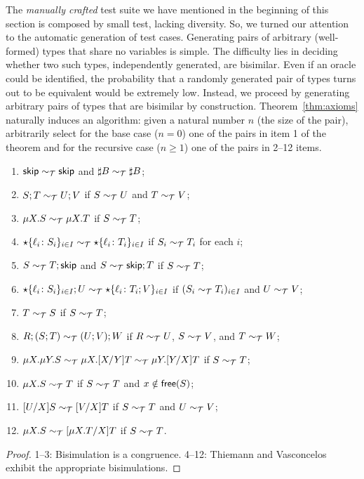 The \emph{manually crafted} test suite we have mentioned in the beginning
of this section is composed by small test, lacking diversity.
So, we turned our attention to the automatic generation of test
cases. Generating pairs of arbitrary (well-formed) types that share no
variables is simple. The difficulty lies in deciding whether two such
types, independently generated, are bisimilar. Even if an oracle could
be identified, the probability that a randomly generated pair of types
turns out to be equivalent would be extremely low. Instead, we proceed
by generating arbitrary pairs of types that are bisimilar by
construction. Theorem~\ref{thm:axioms} naturally induces an algorithm:
given a natural number $n$ (the size of the pair), arbitrarily select
for the base case ($n=0$) one of the pairs in item 1 of the theorem
and for the recursive case ($n\ge1$) one of the pairs in 2--12 items.

\begin{theorem}
\label{thm:axioms}
{\small  \begin{enumerate}[leftmargin=*]
  \item $\mathsf{skip} \sim_\mathcal T \mathsf{skip}$ and $\sharp B \sim_\mathcal T \sharp B$;
  \item $S;T \sim_\mathcal T U;V$ if $S \sim_\mathcal T U$ and $T \sim_\mathcal T V$;
  \item $\mu X.S \sim_\mathcal T \mu X.T$ if $S \sim_\mathcal T T$;
  \item $\star\{\ell_i\colon S_i\}_{i\in I}\sim_\mathcal T
    \star\{\ell_i\colon T_i\}_{i\in I}$ if $S_i \sim_\mathcal T T_i$ for each $i$;
  \item $S\sim_\mathcal T T;\mathsf{skip}$ and $S\sim_\mathcal T \mathsf{skip};T$ if $S \sim_\mathcal T T$;
  \item $\star\{\ell_i\colon S_i\}_{i\in I};U\sim_\mathcal T
    \star\{\ell_i\colon T_i;V\}_{i\in I}$ if $(S_i \sim_\mathcal T T_i)_{i\in
      I}$ and $U \sim_\mathcal T V$;
  \item $T \sim_\mathcal T S$ if $S \sim_\mathcal T T$;
  \item $R;(S;T) \sim_\mathcal T (U;V);W$ if $R \sim_\mathcal T U$, $S \sim_\mathcal T V$, and $T\sim_\mathcal T W$;
  \item
    $\mu X.\mu Y.S \sim_\mathcal T \mu X.[{X}/{Y}]T \sim_\mathcal T \mu Y.[{Y}/{X}]T$ if $S \sim_\mathcal T T$;
  \item $\mu X.S \sim_\mathcal T T$ if $S \sim_\mathcal T T$ and $x\notin\mathsf{free}(S)$;
  \item $[{U}/{X}]S\sim_\mathcal T [{V}/{X}]T$  if $S \sim_\mathcal T T$ and $U \sim_\mathcal T V$;
  \item $\mu X.S \sim_\mathcal T [{\mu X.T}/{X}]T$ if $S \sim_\mathcal T T$.
  \end{enumerate}}
\end{theorem}
%
\begin{proof}
  1--3: Bisimulation is a congruence. 4--12: Thiemann and
  Vasconcelos~\cite{thiemann2016context} exhibit the appropriate
  bisimulations.
\end{proof}

